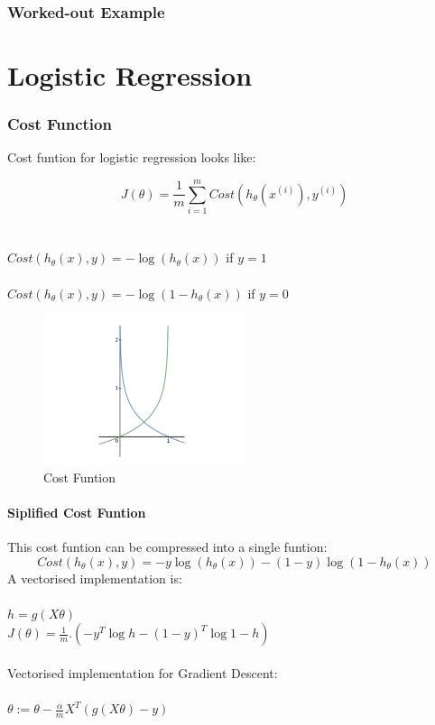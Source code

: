 \documentclass[12pt, A4]{report}
\begin{document}
  \subsection*{Worked-out Example}
	

\chapter{Logistic Regression}

  \subsection*{Cost Function}
    Cost funtion for logistic regression looks like:

    \begin{equation}
      J(\theta) = \frac{1}{m}\sum_{i=1}^{m}Cost(h_\theta(x^{(i)}), y^{(i)})
    \end{equation}
    \\ \\
    $ Cost(h_\theta(x),y) = -\log{(h_\theta{(x)})} $ \hfill if $y = 1$
    \\ \\
    $Cost(h_\theta(x),y) = -\log{(1-h_\theta{(x)})}$  \hfill if $y = 0$

    \begin{figure}[h]
      \centering
      \includegraphics[scale = 0.75]{costlog.png}
      \caption{Cost Funtion}
    \end{figure}

    \subsubsection*{Siplified Cost Funtion}
    This cost funtion can be compressed into a single funtion:
    \begin{equation}
      Cost(h_\theta(x),y) = -y\log{(h_\theta{(x)})} -(1-y)\log{(1-h_\theta{(x)})}
    \end{equation}
    A vectorised implementation is: \\ \\
    $h = g(X\theta)$\\
    $J(\theta) = \frac{1}{m}.(-y^T\log{h}-(1-y)^T\log{1-h})$
    \\ \\
    Vectorised implementation for Gradient Descent: \\ \\
    $\theta := \theta - \frac{\alpha}{m}X^T(g(X\theta)-y)$
\end{document}
